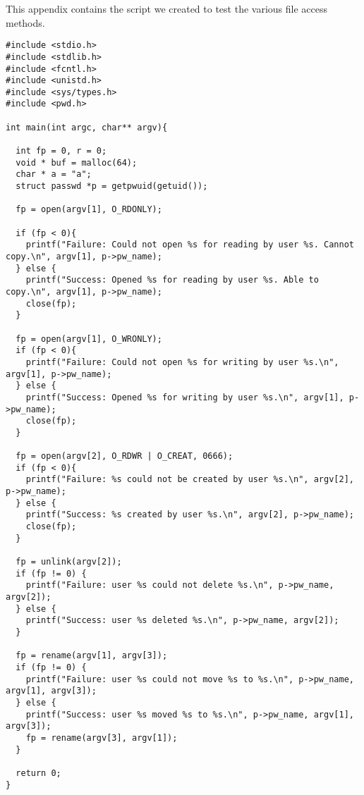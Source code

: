 \label{app:A}



This appendix contains the script we created to test the various file access methods.
\selectfont
\begin{lstlisting}[style=CStyle]
#include <stdio.h>
#include <stdlib.h>
#include <fcntl.h>
#include <unistd.h>
#include <sys/types.h>
#include <pwd.h>

int main(int argc, char** argv){

  int fp = 0, r = 0;
  void * buf = malloc(64);
  char * a = "a";
  struct passwd *p = getpwuid(getuid());
 
  fp = open(argv[1], O_RDONLY);
  
  if (fp < 0){
    printf("Failure: Could not open %s for reading by user %s. Cannot copy.\n", argv[1], p->pw_name);
  } else {
    printf("Success: Opened %s for reading by user %s. Able to copy.\n", argv[1], p->pw_name);
    close(fp);
  }
  
  fp = open(argv[1], O_WRONLY);
  if (fp < 0){
    printf("Failure: Could not open %s for writing by user %s.\n", argv[1], p->pw_name);
  } else {
    printf("Success: Opened %s for writing by user %s.\n", argv[1], p->pw_name);
    close(fp);
  }
  
  fp = open(argv[2], O_RDWR | O_CREAT, 0666);
  if (fp < 0){
    printf("Failure: %s could not be created by user %s.\n", argv[2], p->pw_name);
  } else {
    printf("Success: %s created by user %s.\n", argv[2], p->pw_name);
    close(fp);
  }
  
  fp = unlink(argv[2]);
  if (fp != 0) {
    printf("Failure: user %s could not delete %s.\n", p->pw_name, argv[2]);
  } else {
    printf("Success: user %s deleted %s.\n", p->pw_name, argv[2]);
  }

  fp = rename(argv[1], argv[3]);
  if (fp != 0) {
    printf("Failure: user %s could not move %s to %s.\n", p->pw_name, argv[1], argv[3]);
  } else {
    printf("Success: user %s moved %s to %s.\n", p->pw_name, argv[1], argv[3]);
    fp = rename(argv[3], argv[1]);
  }

  return 0;
}

\end{lstlisting}
\selectfont